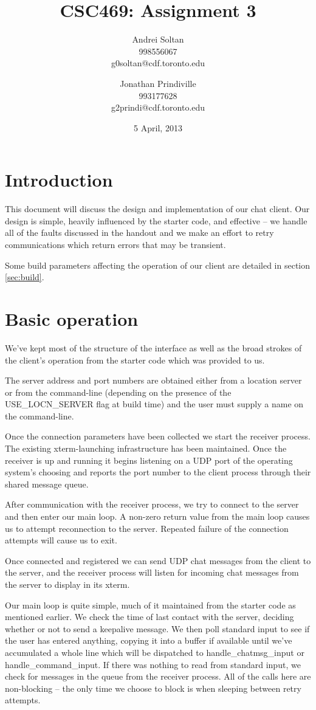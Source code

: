 \documentclass{article}
\author{Andrei Soltan\\998556067\\g0soltan@cdf.toronto.edu
\and Jonathan Prindiville\\993177628\\g2prindi@cdf.toronto.edu}
\title{CSC469: Assignment 3}
\date{5 April, 2013}
\begin{document}
\maketitle

\tableofcontents

\newpage
\section{Introduction}
This document will discuss the design and implementation of our
chat client. Our design is simple, heavily influenced by the
starter code, and effective -- we handle all of the faults discussed
in the handout and we make an effort to retry communications which
return errors that may be transient.

Some build parameters affecting the operation of our client are detailed
in section \ref{sec:build}.

\section{Basic operation}
We've kept most of the structure of the interface as well as the broad
strokes of the client's operation from the starter code which was
provided to us.

The server address and port numbers are obtained either from a location
server or from the command-line (depending on the presence of the
USE\_LOCN\_SERVER flag at build time) and the user must supply a name
on the command-line.

Once the connection parameters have been collected we start the
receiver process. The existing xterm-launching infrastructure has been
maintained. Once the receiver is up and running it begins listening
on a UDP port of the operating system's choosing and reports the port
number to the client process through their shared message queue.

After communication with the receiver process, we try to connect to the
server and then enter our main loop. A non-zero return value from the
main loop causes us to attempt reconnection to the server. Repeated 
failure of the connection attempts will cause us to exit.

Once connected and registered we can send UDP chat messages from the
client to the server, and the receiver process will listen for incoming
chat messages from the server to display in its xterm.

Our main loop is quite simple, much of it maintained from the starter code
as mentioned earlier. We check the time of last contact with the server,
deciding whether or not to send a keepalive message. We then
poll standard input to see if the user has entered anything, copying it into
a buffer if available until we've accumulated a whole line which will be
dispatched to handle\_chatmsg\_input or handle\_command\_input. If there 
was nothing to read from standard input, we check for messages in the
queue from the receiver process. All of the calls here are non-blocking --
the only time we choose to block is when sleeping between retry attempts.
\end{document}

